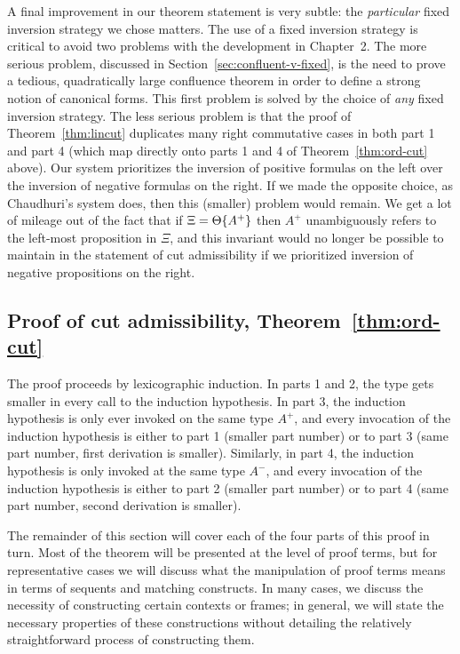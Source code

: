 A final improvement in our theorem statement is very subtle: the {\it
  particular} fixed inversion strategy we chose matters.  The use of a
fixed inversion strategy is critical to avoid two problems with the
development in Chapter~2. The more serious problem, discussed in
Section~\ref{sec:confluent-v-fixed}, is the need to prove a tedious,
quadratically large confluence theorem in order to define a strong
notion of canonical forms. This first problem is solved by the choice
of {\it any} fixed inversion strategy. The less serious problem is
that the proof of Theorem~\ref{thm:lincut} duplicates many right
commutative cases in both part 1 and part 4 (which map directly onto
parts 1 and 4 of Theorem~\ref{thm:ord-cut} above). Our system
prioritizes the inversion of positive formulas on the left over the
inversion of negative formulas on the right. If we made the opposite
choice, as Chaudhuri's system does, then this (smaller) problem 
would remain. We get a lot of mileage out of the
fact that if $\Xi = {\Theta}\{{A^+}\}$ then $A^+$ unambiguously
refers to the left-most proposition in $\Xi$, and this invariant would
no longer be possible to maintain in the statement of cut
admissibility if we prioritized inversion of negative propositions on
the right.


\subsection{Proof of cut admissibility, Theorem~\ref{thm:ord-cut}}

The proof proceeds by lexicographic induction.  In parts 1 and 2, the
type gets smaller in every call to the induction hypothesis. In part
3, the induction hypothesis is only ever invoked on the same type
$A^+$, and every invocation of the induction hypothesis is either to
part 1 (smaller part number) or to part 3 (same part number, first
derivation is smaller). Similarly, in part 4, the induction hypothesis
is only invoked at the same type $A^-$, and every invocation of the
induction hypothesis is either to part 2 (smaller part number) or to
part 4 (same part number, second derivation is smaller).

The remainder of this section will cover each of the four parts of
this proof in turn. Most of the theorem will be presented at the level
of proof terms, but for representative cases we will discuss what the
manipulation of proof terms means in terms of sequents and matching
constructs. In many cases, we discuss the necessity of constructing
certain contexts or frames; in general, we will state the necessary
properties of these constructions without detailing the relatively
straightforward process of constructing them.

